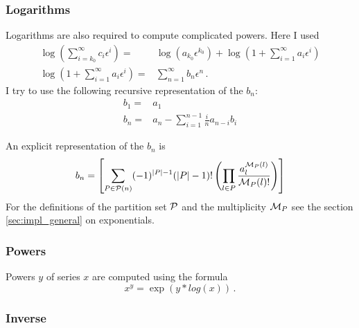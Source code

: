 \documentclass{article}
\begin{document}
\subsubsection{Logarithms}
\label{sec:impl_log}

Logarithms are also required to compute complicated powers. Here I used
\begin{align}
  \label{eq:log}
\log\left(\sum_{i=k_0}^{\infty}c_i \epsilon^i\right)=&\log\left(a_{k_0}\epsilon^{k_0}\right)+\log\left(1+\sum_{i=1}^{\infty}a_i \epsilon^i\right)\\
\log\left(1+\sum_{i=1}^{\infty}a_i \epsilon^i\right)=&\sum_{n=1}^\infty
b_n\epsilon^n\,.
\end{align}
I try to use the following recursive representation of the $b_n$:
\begin{align}
  \label{eq:log_rec}
b_1=&a_1\\
b_n =& a_n - \sum_{i=1}^{n-1} \frac{i}{n} a_{n-i}b_{i}
\end{align}

An explicit representation of the $b_n$ is
\begin{equation}
  \label{eq:log_expl}
  b_n=\left[\sum_{P \in {\cal P}(n)} (-1)^{|P|-1}(|P|-1)!\left(\prod_{l \in P} \frac{a^{{\cal M}_P(l)}_l}{{\cal M}_P(l)!} \right)\right]
\end{equation}
For the definitions of the partition set ${\cal P}$ and the
multiplicity ${\cal M}_P$ see the section \ref{sec:impl_general} on
exponentials.

\subsubsection{Powers}
\label{sec:impl_pow}

Powers $y$ of series $x$ are computed using the formula
\begin{equation}
  \label{eq:pow}
  x^y=\exp(y*log(x))\,.
\end{equation}


\subsubsection{Inverse}
\label{sec:impl_inverse}
\end{document}
